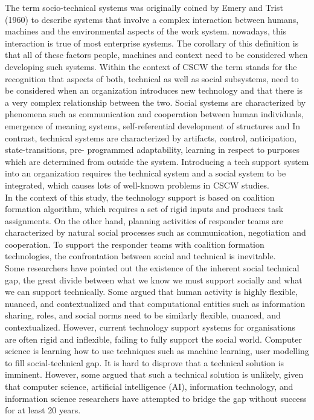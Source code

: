 The term socio-technical systems was originally coined by Emery and Trist (1960) to describe systems that involve a complex interaction between humans, machines and the environmental aspects of the work system. nowadays, this interaction is true of most enterprise systems. The corollary of this definition is that all of these factors  people, machines and context need to be considered when developing such systems. Within the context of CSCW the term stands for the recognition that aspects of both, technical as well as social subsystems, need to be considered when an organization introduces new technology and that there is a very complex relationship between the two. Social systems are characterized by phenomena such as communication and cooperation between human individuals, emergence of meaning systems, self-referential development of structures and In contrast, technical systems are characterized by artifacts, control, anticipation, state-transitions, pre- programmed adaptability, learning in respect to purposes which are determined from outside the system. Introducing a tech support system into an organization requires the technical system and a social system to be integrated, which causes lots of well-known problems in CSCW studies. \\

In the context of this study, the technology support is based on coalition formation algorithm, which requires a set of rigid inputs and produces task assignments. On the other hand, planning activities of responder teams are characterized by natural social processes such as communication, negotiation and cooperation. To support the responder teams with coalition formation technologies, the confrontation between social and technical is inevitable. \\

Some researchers have pointed out the existence of the inherent social technical gap, the great divide between what we know we must support socially and what we can support technically.  Some argued that human activity is highly flexible, nuanced, and contextualized and that computational entities such as information sharing, roles, and social norms need to be similarly flexible, nuanced, and contextualized. However, current technology support systems for organisations are often rigid and inflexible, failing to fully support the social world. Computer science is learning how to use techniques such as machine learning, user modelling to fill social-technical gap. It is hard to disprove that a technical solution is imminent. However, some argued that such a technical solution is unlikely, given that computer science, artificial intelligence (AI), information technology, and information science researchers have attempted to bridge the gap without success for at least 20 years. \\

